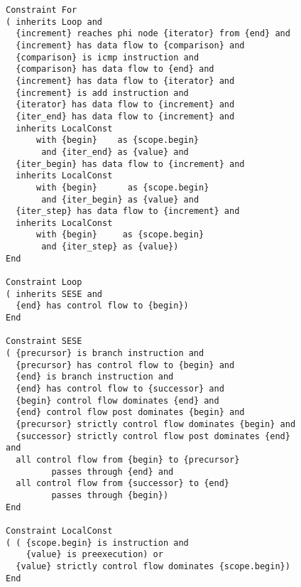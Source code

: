 \begin{figure}[p]
\begin{lstlisting}[language=IDL,basicstyle=\linespread{0.8}\ttfamily,
                   firstnumber=140]
Constraint For
( inherits Loop and
  {increment} reaches phi node {iterator} from {end} and
  {increment} has data flow to {comparison} and
  {comparison} is icmp instruction and
  {comparison} has data flow to {end} and
  {increment} has data flow to {iterator} and
  {increment} is add instruction and
  {iterator} has data flow to {increment} and
  {iter_end} has data flow to {increment} and
  inherits LocalConst
      with {begin}    as {scope.begin}
       and {iter_end} as {value} and
  {iter_begin} has data flow to {increment} and
  inherits LocalConst
      with {begin}      as {scope.begin}
       and {iter_begin} as {value} and
  {iter_step} has data flow to {increment} and
  inherits LocalConst
      with {begin}     as {scope.begin}
       and {iter_step} as {value})
End

Constraint Loop
( inherits SESE and
  {end} has control flow to {begin})
End

Constraint SESE
( {precursor} is branch instruction and
  {precursor} has control flow to {begin} and
  {end} is branch instruction and
  {end} has control flow to {successor} and
  {begin} control flow dominates {end} and
  {end} control flow post dominates {begin} and
  {precursor} strictly control flow dominates {begin} and
  {successor} strictly control flow post dominates {end} and
  all control flow from {begin} to {precursor}
         passes through {end} and
  all control flow from {successor} to {end}
         passes through {begin})
End

Constraint LocalConst
( ( {scope.begin} is instruction and
    {value} is preexecution) or
  {value} strictly control flow dominates {scope.begin})
End
\end{lstlisting}
\end{figure}

